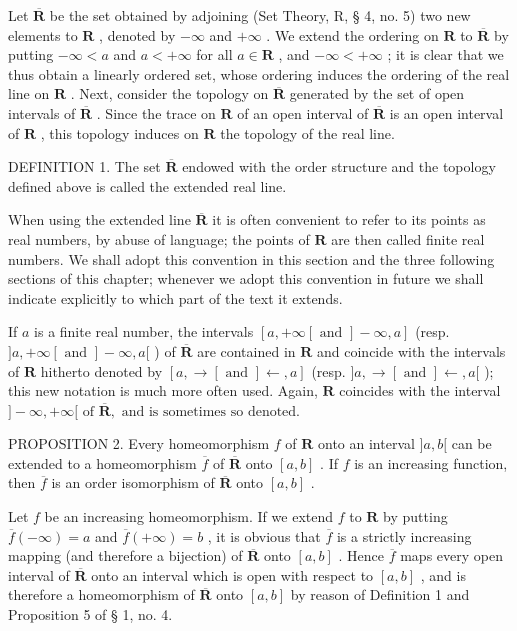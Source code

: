 Let \(\overline{\mathbf{R}}\) be the set obtained by adjoining (Set Theory, R, § 4, no. 5) two new elements to \(\mathbf{R}\) , denoted by \(-\infty\) and \(+\infty\) . We extend the ordering on \(\mathbf{R}\) to \(\overline{\mathbf{R}}\) by putting \(-\infty < a\) and \(a < +\infty\) for all \(a \in \mathbf{R}\) , and \(-\infty < +\infty\) ; it is clear that we thus obtain a linearly ordered set, whose ordering induces the ordering of the real line on \(\mathbf{R}\) . Next, consider the topology on \(\overline{\mathbf{R}}\) generated by the set of open intervals of \(\overline{\mathbf{R}}\) . Since the trace on \(\mathbf{R}\) of an open interval of \(\overline{\mathbf{R}}\) is an open interval of \(\mathbf{R}\) , this topology induces on \(\mathbf{R}\) the topology of the real line.

DEFINITION 1. The set \(\overline{\mathbf{R}}\) endowed with the order structure and the topology defined above is called the extended real line.

When using the extended line \(\overline{\mathbf{R}}\) it is often convenient to refer to its points as real numbers, by abuse of language; the points of \(\mathbf{R}\) are then called finite real numbers. We shall adopt this convention in this section and the three following sections of this chapter; whenever we adopt this convention in future we shall indicate explicitly to which part of the text it extends.

If \(a\) is a finite real number, the intervals \([a, +\infty[ \text{ and } ] - \infty, a]\) (resp. \(]a, +\infty[ \text{ and } ] - \infty, a[\) ) of \(\overline{\mathbf{R}}\) are contained in \(\mathbf{R}\) and coincide with the intervals of \(\mathbf{R}\) hitherto denoted by \([a, \rightarrow[ \text{ and } ] \leftarrow, a]\) (resp. \(]a, \rightarrow[ \text{ and } ] \leftarrow, a[\) ); this new notation is much more often used. Again, \(\mathbf{R}\) coincides with the interval \(] - \infty, +\infty[ \text{ of } \overline{\mathbf{R}}, \text{ and is sometimes so denoted.}\)

PROPOSITION 2. Every homeomorphism \(f\) of \(\mathbf{R}\) onto an interval \(]a, b[\) can be extended to a homeomorphism \(\overline{f}\) of \(\overline{\mathbf{R}}\) onto \([a, b]\) . If \(f\) is an increasing function, then \(\overline{f}\) is an order isomorphism of \(\overline{\mathbf{R}}\) onto \([a, b]\) .

Let \(f\) be an increasing homeomorphism. If we extend \(f\) to \(\mathbf{R}\) by putting \(\overline{f}(-\infty) = a\) and \(\overline{f}(+\infty) = b\) , it is obvious that \(\overline{f}\) is a strictly increasing mapping (and therefore a bijection) of \(\overline{\mathbf{R}}\) onto \([a, b]\) . Hence \(\overline{f}\) maps every open interval of \(\overline{\mathbf{R}}\) onto an interval which is open with respect to \([a, b]\) , and is therefore a homeomorphism of \(\overline{\mathbf{R}}\) onto \([a, b]\) by reason of Definition 1 and Proposition 5 of § 1, no. 4.

